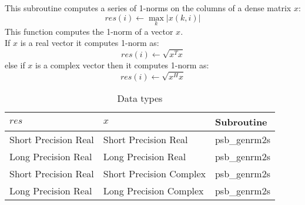 This subroutine computes a series of  1-norms on the columns of
a  dense matrix  $x$: 
\[ res(i) \leftarrow \max_k |x(k,i)| \]
This function computes the 1-norm of a vector $x$.\\
If $x$ is a real vector
it computes 1-norm as:
\[ res(i) \leftarrow \sqrt{x^T x}\]
else if $x$ is a complex vector then it computes 1-norm  as:
\[ res(i) \leftarrow \sqrt{x^H x}\]



\begin{table}[h]
\begin{center}
\begin{tabular}{lll}
\hline
$res$ & $x$ & {\bf Subroutine}\\
\hline
Short Precision Real&Short Precision Real & psb\_genrm2s \\
Long Precision Real&Long Precision Real & psb\_genrm2s \\
Short Precision Real&Short Precision Complex & psb\_genrm2s \\
Long Precision Real&Long Precision Complex & psb\_genrm2s \\
\hline
\end{tabular}
\end{center}
\caption{Data types\label{tab:f90nrm2s}}
\end{table}


